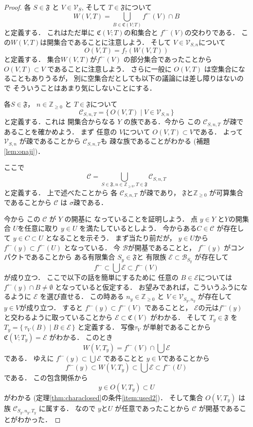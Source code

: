 \documentclass[leqno, a4paper, 12pt]{jsarticle}
\newcommand{\zz}{\mathbb{Z}}
\newcommand{\myinv}[1]{#1^{\gets}}
\newcommand{\mysm}[1]{#1_{?}}
\newcommand{\myps}{\mathfrak{F}}
\newcommand{\mycrset}[1]{\mathfrak{C}(#1)}
\newcommand{\myopseta}[1]{W(#1)}
\newcommand{\myopsetb}[1]{O(#1)}
\newcommand{\mysha}[1]{\tau_{#1}}
\begin{document}
\begin{proof}
各
$S\in \myps$
と
$V\in \mathcal{V}_{S}$, 
そして
$T\in \myps$について
\[
\myopseta{V, T}=\bigcup_{B\in \mycrset{V; T}}\myinv{f}(V)\cap B
\]
と定義する．
これはただ単に
$\mycrset{V; T}$の和集合と
$\myinv{f}(V)$の交わりである．
この$\myopseta{V, T}$は開集合であることに注意しよう．
そして
$V\in \mathcal{V}_{S, n}$について
\[
\myopsetb{V, T}=\mysm{f}\left(\myopseta{V, T}\right)
\]
と定義する．
集合$\myopseta{V, T}$が$\myinv{f}(V)$
の部分集合であったことから
$\myopsetb{V, T}\subset V$
であることに注意しよう．
さらに一般に
$\myopsetb{V, T}$
は空集合になることもありうるが，
別に空集合だとしても以下の議論には差し障りはないので
そういうことはあまり気にしないことにする．


各$S\in \myps$，
$n\in \zz_{\ge 0}$
と
$T\in \myps$について
\[
\mathcal{C}_{S, n, T}
=\{\, \myopsetb{V, T}\mid V\in \mathcal{V}_{S, n}\, \}
\]
と定義する．これは
開集合からなる
$Y$
の族である．今から
この
$\mathcal{C}_{S, n, T}$
が疎であることを確かめよう．
まず
任意の
$V$について
$\myopsetb{V, T}\subset V$である．
よって
$\mathcal{V}_{S, n}$
が疎であることから
$\mathcal{C}_{S, n, T}$も
疎な族であることがわかる
(補題\ref{lem:onaji})．

ここで
\[
\mathcal{C}=\bigcup_{S\in \myps, n\in \zz_{\ge 0}, T\in \myps}\mathcal{C}_{S, n, T}
\]
と定義する．
上で述べたことから
各
$\mathcal{C}_{S, n, T}$
が疎であり，
$\myps$と$\zz_{\ge 0}$
が可算集合であることから
$\mathcal{C}$
は
$\sigma$疎である．


今から
この
$\mathcal{C}$
が
$Y$
の開基に
なっていることを証明しよう．
点
$y\in Y$
と$Y$の開集合
$U$を任意に取り
$y\in U$
を満たしているとしよう．
今からある$C\in \mathcal{C}$
が存在して
$y\in C\subset U$
となることを示そう．
まず当たり前だが，
$y\in U$から
$\myinv{f}(y)\subset \myinv{f}(U)$
となっている．
今
$\mathcal{B}$が開基であることと，
$\myinv{f}(y)$
がコンパクトであることから
ある有限集合
$S_{y}\in \myps$と
有限族
$\mathcal{E}\subset \mathcal{B}_{S_{y}}$
が存在して
\[
\myinv{f}\subset \bigcup\mathcal{E}\subset \myinv{f}(V)\]
が成り立つ．
ここで以下の話を簡単にするために
任意の
$B\in \mathcal{E}$については
$\myinv{f}(y)\cap B\neq \emptyset$
となっていると仮定する．
お望みであれば，こういうふうになるように
$\mathcal{E}$
を選び直せる．
この時ある
$n_{y}\in \zz_{\ge 0}$
と
$V\in \mathcal{V}_{S_{y}, n_{y}}$
が存在して
$y\in V$が成り立つ．
すると
$\myinv{f}(y)\subset \myinv{f}(V)$
であることと，
$\mathcal{E}$の元は$\myinv{f}(y)$
と交わるように取っていることから
$\mathcal{E}\subset \mycrset{V}$
がわかる．
そして
$T_{y}\in \myps$
を
$T_{y}=\{\, \mysha{V}(B)\mid B\in \mathcal{E} \, \}$
と定義する．
写像$\mysha{V}$
が単射であることから
$\mycrset{V; T_{y}}=\mathcal{E}$
がわかる．
このとき
\[
\myopseta{V, T_{y}}=\myinv{f}(V)\cap \bigcup\mathcal{E}
\]
である．
ゆえに
$\myinv{f}(y)\subset \bigcup\mathcal{E}$
であることと
$y\in V$であることから
\[
\myinv{f}(y)\subset \myopseta{V, T_{y}}\subset \bigcup\mathcal{E}\subset \myinv{f}(U)
\]
である．
この包含関係から
\[
y\in \myopsetb{V, T_{y}}\subset U
\]
がわかる
(定理\ref{thm:characlosed}の条件\ref{item:used2})．
そして集合
$\myopsetb{V, T_{y}}$
は
族
$\mathcal{C}_{S_{y}, n_{y}, T_{y}}$
に属する．
なので
$y$と$U$
が任意であったことから
$\mathcal{C}$
が開基であることがわかった．


\end{proof}
\end{document}
